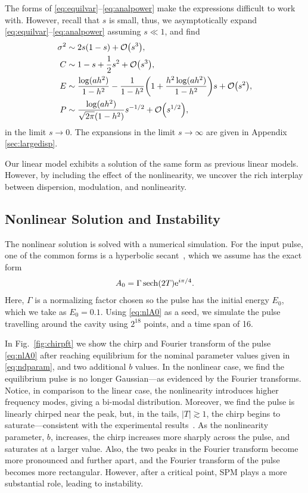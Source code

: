\documentclass[9pt,twocolumn,twoside]{osajnl}
\let\originalleft\left
\let\originalright\right
\renewcommand{\left}{\mathopen{}\mathclose\bgroup\originalleft}
\renewcommand{\right}{\aftergroup\egroup\originalright}
\providecommand{\bigO}[1]{\ensuremath{\mathop{}\mathopen{}\mathcal{O}\mathopen{}\left(#1\right)}} %
\DeclareMathOperator{\sech}{sech}
\begin{document}
The forms of \eqref{eq:equilvar}--\eqref{eq:analpower} make the expressions difficult to work with. However, recall that $s$ is small, thus, we asymptotically expand \eqref{eq:equilvar}--\eqref{eq:analpower} assuming $s \ll 1$, and find
\begin{align}
	\sigma^2 &\sim 2s(1 - s) + \bigO{s^3}, \\
	C &\sim 1 - s + \frac{1}{2}s^2 + \bigO{s^3}, \\
	E &\sim \frac{\log (a h^2)}{1 - h^2} - \frac{1}{1 - h^2} \left( 1 + \frac{h^2 \log(a h^2)}{1 - h^2}  \right) s + \bigO{s^2}, \label{eq:maxenergy} \\
	P &\sim \frac{\log(ah^2)}{\sqrt{2 \pi}(1 - h^2)} s^{-1/2} + \bigO{s^{1/2}},
\end{align}
in the limit $s \rightarrow 0$. The expansions in the limit $s \rightarrow \infty$ are given in Appendix \ref{sec:largedisp}.

Our linear model exhibits a solution of the same form as previous linear models. However, by including the effect of the nonlinearity, we uncover the rich interplay between dispersion, modulation, and nonlinearity.

\subsection{Nonlinear Solution and Instability}
\label{sec:nlresults}
The nonlinear solution is solved with a numerical simulation. For the input pulse, one of the common forms is a hyperbolic secant~\cite{coen1997, finot2008, rothenberg1989b, tomlinson1984}, which we assume has the exact form
\begin{align}
	A_0 = \Gamma \sech \left( 2 T \right) \textrm{e}^{i \pi / 4}.
	\label{eq:nlA0}
\end{align}
Here, $\Gamma$ is a normalizing factor chosen so the pulse has the initial energy $E_0$, which we take as $E_0 = 0.1$. Using \eqref{eq:nlA0} as a seed, we simulate the pulse travelling around the cavity using $2^{18}$ points, and a time span of 16.

In Fig.~\ref{fig:chirpft} we show the chirp and Fourier transform of the pulse \eqref{eq:nlA0} after reaching equilibrium for the nominal parameter values given in \eqref{eq:ndparam}, and two additional $b$ values. In the nonlinear case, we find the equilibrium pulse is no longer Gaussian---as evidenced by the Fourier transforms. Notice, in comparison to the linear case, the nonlinearity introduces higher frequency modes, giving a bi-modal distribution. Moreover, we find the pulse is linearly chirped near the peak, but, in the tails, $|T| \gtrsim 1$, the chirp begins to saturate---consistent with the experimental results~\cite{chen2008, rothenberg1989b, tomlinson1985}. As the nonlinearity parameter, $b$, increases, the chirp increases more sharply across the pulse, and saturates at a larger value. Also, the two peaks in the Fourier transform become more pronounced and further apart, and the Fourier transform of the pulse becomes more rectangular. However, after a critical point, SPM plays a more substantial role, leading to instability.
\end{document}
